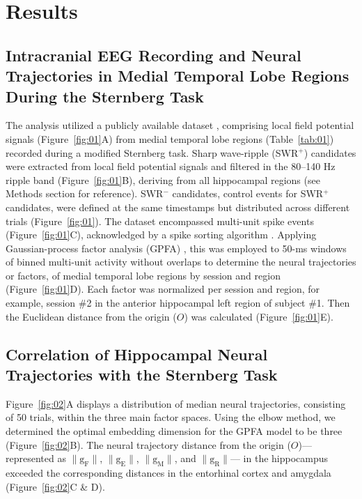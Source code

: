 \section{Results}
\subsection{Intracranial EEG Recording and Neural Trajectories in Medial Temporal Lobe Regions During the Sternberg Task}

The analysis utilized a publicly available dataset \cite{boran_dataset_2020}, comprising local field potential signals (Figure~\ref{fig:01}A) from medial temporal lobe regions (Table~\ref{tab:01}) recorded during a modified Sternberg task. Sharp wave-ripple (SWR$^+$) candidates were extracted from local field potential signals and filtered in the 80--140 Hz ripple band (Figure~\ref{fig:01}B), deriving from all hippocampal regions (see Methods section for reference). SWR$^-$ candidates, control events for SWR$^+$ candidates, were defined at the same timestamps but distributed across different trials (Figure~\ref{fig:01}). The dataset encompassed multi-unit spike events (Figure~\ref{fig:01}C), acknowledged by a spike sorting algorithm \cite{niediek_reliable_2016}. Applying Gaussian-process factor analysis (GPFA) \cite{yu_gaussian-process_2009}, this was employed to 50-ms windows of binned multi-unit activity without overlaps to determine the neural trajectories or factors, of medial temporal lobe regions by session and region (Figure~\ref{fig:01}D). Each factor was normalized per session and region, for example, session \#2 in the anterior hippocampal left region of subject \#1. Then the Euclidean distance from the origin ($O$) was calculated (Figure~\ref{fig:01}E).

\subsection{Correlation of Hippocampal Neural Trajectories with the Sternberg Task}
Figure~\ref{fig:02}A displays a distribution of median neural trajectories, consisting of 50 trials, within the three main factor spaces. Using the elbow method, we determined the optimal embedding dimension for the GPFA model to be three (Figure~\ref{fig:02}B). The neural trajectory distance from the origin ($O$)— represented as $\mathrm{\lVert g_{F} \rVert}$, $\mathrm{\lVert g_{E} \rVert}$, $\mathrm{\lVert g_{M} \rVert}$, and $\mathrm{\lVert g_{R} \rVert}$— in the hippocampus exceeded the corresponding distances in the entorhinal cortex and amygdala (Figure~\ref{fig:02}C \& D).

